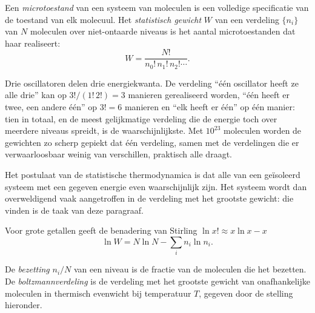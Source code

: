 \begin{definition}\label{def:b3:partition-functions:microstate}
Een \emph{microtoestand} van een systeem van moleculen
is een volledige specificatie van de toestand van elk molecuul. Het
\emph{statistisch gewicht} $W$ van een verdeling
$\{n_i\}$ van $N$ moleculen over
niet-ontaarde niveaus is het aantal microtoestanden dat haar realiseert:
\[
  W = \frac{N!}{n_0!\,n_1!\,n_2!\cdots}.
\]
\end{definition}

\begin{example}\label{ex:b3:partition-functions:three-quanta}
Drie oscillatoren delen drie energiekwanta. De verdeling ``één oscillator
heeft ze alle drie'' kan op $3!/(1!\,2!) = 3$ manieren gerealiseerd worden,
``één heeft er twee, een andere één'' op $3! = 6$ manieren en ``elk heeft
er één'' op één manier: tien  in totaal, en de meest
gelijkmatige verdeling die de energie toch over meerdere niveaus spreidt,
is de waarschijnlijkste. Met $10^{23}$ moleculen worden de gewichten zo
scherp gepiekt dat één verdeling, samen met de verdelingen die er
verwaarloosbaar weinig van verschillen, praktisch alle 
draagt.
\end{example}

\begin{remark}
Het postulaat van de statistische thermodynamica is dat alle
 van een geïsoleerd systeem met een gegeven energie even
waarschijnlijk zijn. Het systeem wordt dan overweldigend vaak aangetroffen
in de verdeling met het grootste gewicht: die vinden is de taak van deze
paragraaf.
\end{remark}

Voor grote getallen geeft de benadering van Stirling $\ln x! \approx x\ln x - x$
\[
  \ln W = N\ln N - \sum_i n_i\ln n_i .
\]

\begin{definition}\label{def:b3:partition-functions:boltzmann}
De \emph{bezetting} $n_i/N$ van een niveau is de fractie
van de moleculen die het bezetten. De
\emph{boltzmannverdeling}
is de verdeling met het grootste gewicht van onafhankelijke moleculen in
thermisch evenwicht bij temperatuur $T$, gegeven door de stelling
hieronder.
\end{definition}

